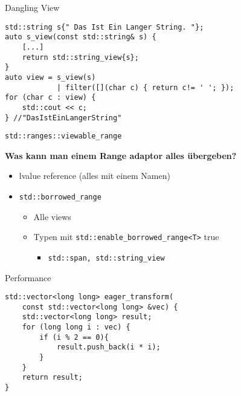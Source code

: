 \begin{frame}[fragile]{Dangling View}
    \begin{verbatim}
std::string s{" Das Ist Ein Langer String. "};
auto s_view(const std::string& s) {
    [...]
    return std::string_view{s};
}
auto view = s_view(s)
            | filter([](char c) { return c!= ' '; });
for (char c : view) {
    std::cout << c;
} //"DasIstEinLangerString"
    \end{verbatim}
\end{frame}

\begin{frame}{\texttt{std::ranges::viewable_range}}
    \begin{center}
        \textbf{Was kann man einem Range adaptor alles übergeben?}
    \end{center}

    \vspace{2.5em}


    \begin{itemize}
        \item<3-> lvalue reference (alles mit einem Namen)
        \item<4-> \texttt{std::borrowed_range}
            \begin{itemize}
                \item<5-> Alle views
                \item<6-> Typen mit \texttt{std::enable_borrowed_range<T>} true
                    \begin{itemize}
                        \item<7-> \texttt{std::span, std::string_view}
                    \end{itemize}
            \end{itemize}
    \end{itemize}
\end{frame}

\begin{frame}[fragile]{Performance}
    \begin{verbatim}
std::vector<long long> eager_transform(
    const std::vector<long long> &vec) {
    std::vector<long long> result;
    for (long long i : vec) {
        if (i % 2 == 0){
            result.push_back(i * i);
        }
    }
    return result;
}
    \end{verbatim}
\end{frame}

